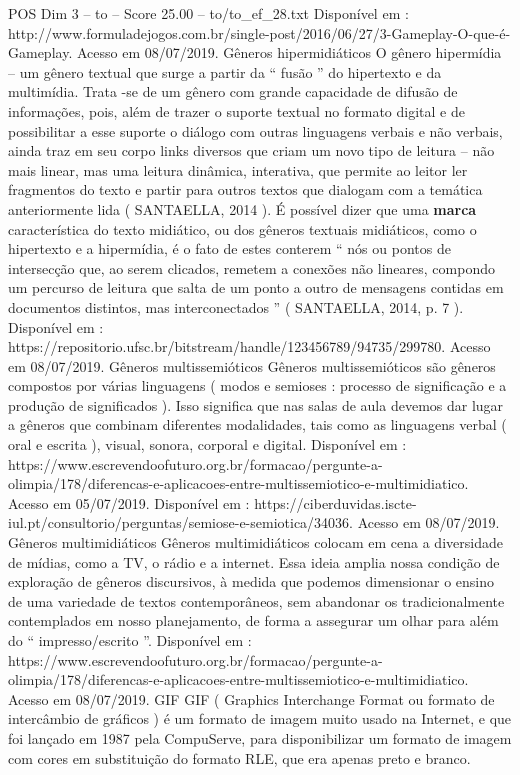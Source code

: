 \begin{textsample}{POS Dim 3 – to – Score 25.00 – to/to\_ef\_28.txt}
Disponível em : http://www.formuladejogos.com.br/single-post/2016/06/27/3-Gameplay-O-que-é-Gameplay.
Acesso em 08/07/2019.
Gêneros hipermidiáticos O gênero hipermídia – um gênero textual que surge a partir da “ fusão ” do hipertexto e da multimídia.
Trata -se de um gênero com grande capacidade de difusão de informações, pois, além de trazer o suporte textual no formato digital e de possibilitar a esse suporte o diálogo com outras linguagens verbais e não verbais, ainda traz em seu corpo links diversos que criam um novo tipo de leitura – não mais linear, mas uma leitura dinâmica, interativa, que permite ao leitor ler fragmentos do texto e partir para outros textos que dialogam com a temática anteriormente lida ( SANTAELLA, 2014 ).
É possível dizer que uma \textbf{marca} característica do texto midiático, ou dos gêneros textuais midiáticos, como o hipertexto e a hipermídia, é o fato de estes conterem “ nós ou pontos de intersecção que, ao serem clicados, remetem a conexões não lineares, compondo um percurso de leitura que salta de um ponto a outro de mensagens contidas em documentos distintos, mas interconectados ” ( SANTAELLA, 2014, p. 7 ).
Disponível em : https://repositorio.ufsc.br/bitstream/handle/123456789/94735/299780.
Acesso em 08/07/2019.
Gêneros multissemióticos Gêneros multissemióticos são gêneros compostos por várias linguagens ( modos e semioses : processo de significação e a produção de significados ).
Isso significa que nas salas de aula devemos dar lugar a gêneros que combinam diferentes modalidades, tais como as linguagens verbal ( oral e escrita ), visual, sonora, corporal e digital.
Disponível em : https://www.escrevendoofuturo.org.br/formacao/pergunte-a-olimpia/178/diferencas-e-aplicacoes-entre-multissemiotico-e-multimidiatico.
Acesso em 05/07/2019.
Disponível em : https://ciberduvidas.iscte-iul.pt/consultorio/perguntas/semiose-e-semiotica/34036.
Acesso em 08/07/2019.
Gêneros multimidiáticos Gêneros multimidiáticos colocam em cena a diversidade de mídias, como a TV, o rádio e a internet.
Essa ideia amplia nossa condição de exploração de gêneros discursivos, à medida que podemos dimensionar o ensino de uma variedade de textos contemporâneos, sem abandonar os tradicionalmente contemplados em nosso planejamento, de forma a assegurar um olhar para além do “ impresso/escrito ”.
Disponível em : https://www.escrevendoofuturo.org.br/formacao/pergunte-a-olimpia/178/diferencas-e-aplicacoes-entre-multissemiotico-e-multimidiatico.
Acesso em 08/07/2019.
GIF GIF ( Graphics Interchange Format ou formato de intercâmbio de gráficos ) é um formato de imagem muito usado na Internet, e que foi lançado em 1987 pela CompuServe, para disponibilizar um formato de imagem com cores em substituição do formato RLE, que era apenas preto e branco.

\end{textsample}
